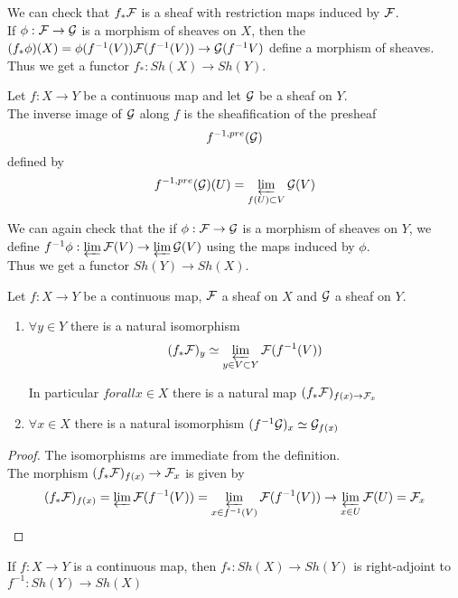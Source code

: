 \documentclass[../main.tex]{subfiles}
\begin{document}
We can check that $f_{\ast} \mathcal{F}$ is a sheaf with restriction maps induced by $\mathcal{F}$.\\
If $\phi:\mathcal{F}\to \mathcal{G}$ is a morphism of sheaves on $X$, then the $( f_{\ast}\phi )( X) =\phi( f^{-1}( V) ) \mathcal{F}( f^{-1}( V) ) \to \mathcal{G}( f^{-1}V)  $ define a morphism of sheaves.\\
Thus we get a functor $f_{\ast} : Sh( X) \to Sh( Y) $.\\
\begin{defn}
	Let $f:X\to Y$ be a continuous map and let $\mathcal{G}$ be a sheaf on $Y$.\\
	The inverse image of $\mathcal{G}$ along $f$ is the sheafification of the presheaf 
	\[ 
	f^{-1,pre}( \mathcal{G}) 
	\]
	defined by 
	\[ 
	f^{-1,pre}( \mathcal{G}) ( U) = \varprojlim_{f( U) \subset V} \mathcal{G}( V) 
	\]
	
\end{defn}
We can again check that the if $\phi:\mathcal{F}\to \mathcal{G}$ is a morphism of sheaves on $Y$, we define $f^{-1}\phi :\varprojlim \mathcal{F}( V) \to \varprojlim \mathcal{G}( V) $ using the maps induced by $\phi$.\\
Thus we get a functor $Sh( Y) \to Sh( X) $.\\
\begin{lemma}
Let $f:X\to Y$ be a continuous map, $\mathcal{F}$ a sheaf on $X$ and $\mathcal{G}$ a sheaf on $Y$.\\
\begin{enumerate}
\item $\forall y \in Y$ there is a natural isomorphism
	\[ 
		( f_\ast\mathcal{F})_y \simeq \varprojlim_{y \in V\subset Y} \mathcal{F}( f^{-1}( V) ) 
	\]

In particular $forall x \in X$ there is a natural map $( f_{\ast} \mathcal{F})_{f( x) \to \mathcal{F}_x} $
\item $\forall x \in X$ there is a natural isomorphism $( f^{-1}\mathcal{G})_x \simeq \mathcal{G}_{f( x) } $ 
\end{enumerate}
\end{lemma}
\begin{proof}
The isomorphisms are immediate from the definition.\\
The morphism $( f_\ast\mathcal{F}) _{f( x) } \to \mathcal{F}_x$ is given by
\[ 
	( f_\ast \mathcal{F})_{f( x) } = \varprojlim \mathcal{F}( f^{-1}( V) ) = \varprojlim_{x\in f^{-1 }( V) } \mathcal{F}( f^{-1}( V) ) \to \varprojlim_{x\in U}  \mathcal{F}(  U) = \mathcal{F}_x
\]

\end{proof}
\begin{propo}
If $f:X\to Y$ is a continuous map, then $f_\ast: Sh( X) \to Sh( Y) $ is right-adjoint to $f^{-1}:Sh( Y) \to Sh( X) $ 
\end{propo}
\end{document}
